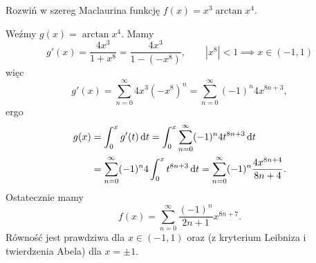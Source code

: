 \begin{example}
    Rozwiń w szereg Maclaurina funkcję $f(x) = x^3\arctan{x^4}$.
\end{example}
\begin{solution}
    Weźmy $g(x) = \arctan{x^4}$. Mamy
    \[ g'(x) = \frac{4x^3}{1 + x^8} = \frac{4x^3}{1 - (-x^8)}, \hspace{2em} |x^8| < 1 \implies x \in (-1, 1) \]
    więc
    \[ g'(x) = \sum_{n=0}^\infty 4x^3 (-x^8)^n = \sum_{n=0}^\infty (-1)^n 4x^{8n+3}, \]
    ergo
    \begin{align*}
        g(x) &= \int_0^x g'(t) \operatorname{d}\!{t} = \int_0^x\sum_{n=0}^\infty (-1)^n 4t^{8n+3} \operatorname{d}\!{t} \\
        &= \sum_{n=0}^\infty (-1)^n 4 \int_0^x t^{8n+3} \operatorname{d}\!{t} = \sum_{n=0}^\infty (-1)^n \frac{4x^{8n+4}}{8n+4}.
    \end{align*}
    Ostatecznie mamy
    \[ f(x) = \sum_{n=0}^\infty \frac{(-1)^n}{2n+1}x^{8n+7}. \]
    Równość jest prawdziwa dla $x \in (-1, 1)$ oraz (z kryterium Leibniza i twierdzenia Abela) dla $x = \pm 1$.
\end{solution}